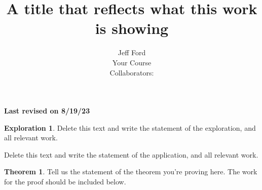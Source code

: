 \documentclass[12 pt]{article}
\theoremstyle{definition}
\newtheorem*{thm}{Theorem}
\newtheorem*{exploration}{Exploration}
\newcommand\rev[1]{\noindent\textbf{Last revised on {#1}}\\}
\begin{document}
 
 
\title{A title that reflects what this work is showing}%
\author{Jeff Ford\\ %
Your Course\\ %
Collaborators: } %
 
\maketitle
\rev{8/19/23} %

\begin{exploration} 
Delete this text and write the statement of the exploration, and all relevant work.
\end{exploration}

\begin{application}
Delete this text and write the statement of the application, and all relevant work.
\end{application}

\begin{thm}
Tell us the statement of the theorem you're proving here. The work for the proof should be included below.
\end{thm}
\end{document}
